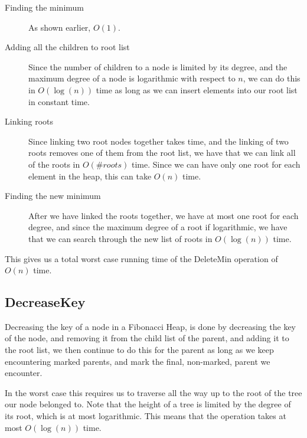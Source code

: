 \begin{description}
\item[Finding the minimum] As shown earlier, $O(1)$.
\item[Adding all the children to root list] Since the number of children to a node is limited by its degree, and the maximum degree of a node is logarithmic with respect to $n$, we can do this in $O(\log (n))$ time as long as we can insert elements into our root list in constant time.
\item[Linking roots] Since linking two root nodes together takes time, and the linking of two roots removes one of them from the root list, we have that we can link all of the roots in $O(\#roots)$ time. Since we can have only one root for each element in the heap, this can take $O(n)$ time.
\item[Finding the new minimum] After we have linked the roots together, we have at most one root for each degree, and since the maximum degree of a root if logarithmic, we have that we can search through the new list of roots in $O(\log (n))$ time.
\end{description}

This gives us a total worst case running time of the DeleteMin operation of $O(n)$ time.

\subsection{DecreaseKey}
Decreasing the key of a node in a Fibonacci Heap, is done by decreasing the key of the node, and removing it from the child list of the parent, and adding it to the root list, we then continue to do this for the parent as long as we keep encountering marked parents, and mark the final, non-marked, parent we encounter.

In the worst case this requires us to traverse all the way up to the root of the tree our node belonged to. Note that the height of a tree is limited by the degree of its root, which is at most logarithmic. This means that the operation takes at most $O(\log (n))$ time.
